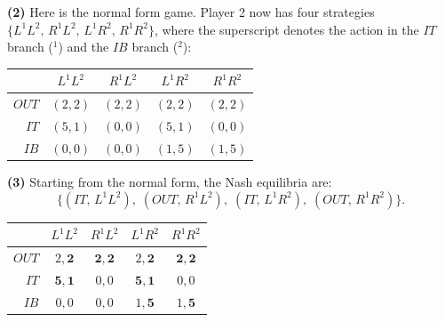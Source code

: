 \documentclass[11pt,english]{article}
\begin{document}
\begin{enumerate}
\begin{solution}
\begin{center}
\end{center}
 
\textbf{(2)} Here is the normal form game. Player 2 now has four strategies
$\{L^1L^2,\, R^1L^2,\, L^1R^2,\, R^1R^2\}$, where the superscript denotes
the action in the $IT$ branch (${}^1$) and the $IB$ branch (${}^2$):
 
\begin{center}
\begin{tabular}{r|cccc}
\toprule
        & $L^1L^2$ & $R^1L^2$ & $L^1R^2$ & $R^1R^2$ \\
\midrule
$OUT$   & $(2,2)$  & $(2,2)$  & $(2,2)$  & $(2,2)$  \\
$IT$    & $(5,1)$  & $(0,0)$  & $(5,1)$  & $(0,0)$  \\
$IB$    & $(0,0)$  & $(0,0)$  & $(1,5)$  & $(1,5)$  \\
\bottomrule
\end{tabular}
\end{center}
 
\textbf{(3)} Starting from the normal form, the Nash equilibria are:
\[
    \bigl\{(IT,\, L^1L^2),\;(OUT,\, R^1L^2),\;(IT,\, L^1R^2),\;(OUT,\, R^1R^2)\bigr\}.
\]
 
\begin{center}
\begin{tabular}{r|cccc}
\toprule
        & $L^1L^2$        & $R^1L^2$        & $L^1R^2$        & $R^1R^2$        \\
\midrule
$OUT$   & $2,\mathbf{2}$           & $\mathbf{2,2}$  & $2,\mathbf{2}$           & $\mathbf{2,2}$  \\
$IT$    & $\mathbf{5,1}$  & $0,0$           & $\mathbf{5,1}$  & $0,0$           \\
$IB$    & $0,0$           & $0,0$           & $1,\mathbf{5}$           & $1,\mathbf{5}$           \\
\bottomrule
\end{tabular}
\end{center}
 

\end{solution}
\end{enumerate}
\end{document}
